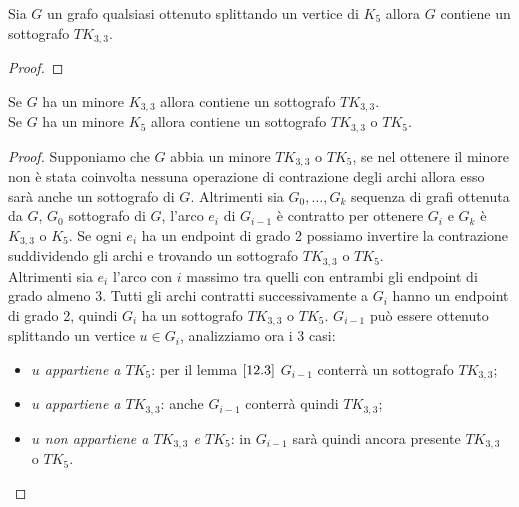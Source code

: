 \begin{lemma}\label{12.3}
    Sia \(G\) un grafo qualsiasi ottenuto splittando un vertice di \(K_5\) allora \(G\) contiene un sottografo \(TK_{3,3}\).
    \begin{proof}
        
    \end{proof}
\end{lemma}

\begin{teorema}\label{minoreTK5}
    Se \(G\) ha un minore \(K_{3,3}\) allora contiene un sottografo \(TK_{3,3}\). \\
    Se \(G\) ha un minore \(K_5\) allora contiene un sottografo \(TK_{3,3}\) o \(TK_5\).
    \begin{proof}
        Supponiamo che \(G\) abbia un minore \(TK_{3,3}\) o \(TK_5\), se nel ottenere il minore non è stata coinvolta nessuna operazione di contrazione degli archi allora esso sarà anche un sottografo di \(G\). Altrimenti sia \(G_0,\dots, G_k\) sequenza di grafi ottenuta da \(G\), \(G_0\) sottografo di \(G\), l'arco \(e_i\) di \(G_{i-1}\) è contratto per ottenere \(G_i\) e \(G_k\) è \(K_{3,3}\) o \(K_5\).
        Se ogni \(e_i\) ha un endpoint di grado 2 possiamo invertire la contrazione suddividendo gli archi e trovando un sottografo \(TK_{3,3}\) o \(TK_5\). 
        \\ Altrimenti sia \(e_i\) l'arco con \(i\) massimo tra quelli con entrambi gli endpoint di grado almeno 3. Tutti gli archi contratti successivamente a \(G_i\) hanno un endpoint di grado 2, quindi \(G_i\) ha un sottografo \(TK_{3,3}\) o \(TK_5\). \(G_{i-1}\) può essere ottenuto splittando un vertice \(u \in G_i\), analizziamo ora i 3 casi:
        \begin{itemize}
            \item \textit{\(u\) appartiene a \(TK_5\)}: per il lemma \(\ref{12.3}\) \(G_{i-1}\) conterrà un sottografo \(TK_{3,3}\);
            \item \textit{\(u\) appartiene a \(TK_{3,3}\)}: anche \(G_{i-1}\) conterrà quindi \(TK_{3,3}\);
            \item \textit{\(u\) non appartiene a \(TK_{3,3}\) e \(TK_5\)}: in \(G_{i-1}\) sarà quindi ancora presente \(TK_{3,3}\) o \(TK_5\).
        \end{itemize}
    \end{proof}
\end{teorema}

